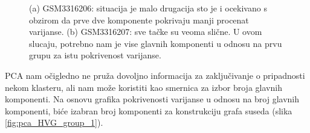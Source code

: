 \documentclass{article}
\begin{document}
\begin{figure}[H]
    \centering
    \caption{ (a) GSM3316206: situacija je malo drugacija sto je i ocekivano s obzirom da prve dve komponente pokrivaju manji procenat varijanse. (b) GSM3316207: sve tačke su veoma slične. U ovom slucaju, potrebno nam je vise glavnih komponenti u odnosu na prvu grupu za istu pokrivenost varijanse. }
    \label{fig:pca_HVG_group_2}
\end{figure}

PCA nam očigledno ne pruža dovoljno informacija za zaključivanje o pripadnosti nekom klasteru, ali nam može koristiti kao smernica za izbor broja glavnih komponenti. Na osnovu grafika pokrivenosti varijanse u odnosu na broj glavnih komponenti, biće izabran broj komponenti za konstrukciju grafa suseda (slika \ref{fig:pca_HVG_group_1}). 
\end{document}
